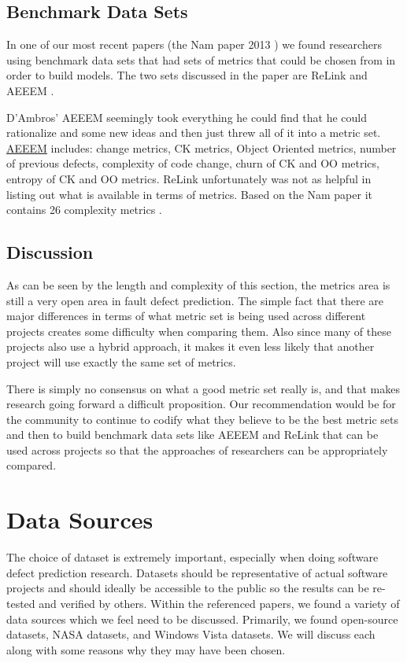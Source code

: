 \documentclass{sig-alternate-05-2015}
\begin{document}
\subsection{Benchmark Data Sets}

In one of our most recent papers (the Nam paper 2013 \cite{Nam}) we found researchers using benchmark data sets that had sets of metrics that could be chosen from in order to build models.  The two sets discussed in the paper are ReLink and AEEEM \cite{Wu} \cite{DAmbros}.  

D'Ambros' AEEEM seemingly took everything he could find that he could rationalize and some new ideas and then just threw all of it into a metric set.  \href{http://bug.inf.usi.ch/}{AEEEM} includes: change metrics, CK metrics, Object Oriented metrics, number of previous defects, complexity of code change, churn of CK and OO metrics, entropy of CK and OO metrics.  ReLink unfortunately was not as helpful in listing out what is available in terms of metrics.  Based on the Nam paper it contains 26 complexity metrics \cite{Nam}.

\subsection{Discussion}
As can be seen by the length and complexity of this section, the metrics area is still a very open area in fault defect prediction.  The simple fact that there are major differences in terms of what metric set is being used across different projects creates some difficulty when comparing them.  Also since many of these projects also use a hybrid approach, it makes it even less likely that another project will use exactly the same set of metrics.  

There is simply no consensus on what a good metric set really is, and that makes research going forward a difficult proposition.  Our recommendation would be for the community to continue to codify what they believe to be the best metric sets and then to build benchmark data sets like AEEEM and ReLink that can be used across projects so that the approaches of researchers can be appropriately compared. 

\section{Data Sources}
The choice of dataset is extremely important, especially when doing software defect prediction research. Datasets should be representative of actual software projects and should ideally be accessible to the public so the results can be re-tested and verified by others. Within the referenced papers, we found a variety of data sources which we feel need to be discussed. Primarily, we found open-source datasets, NASA datasets, and Windows Vista datasets. We will discuss each along with some reasons why they may have been chosen.
\end{document}
